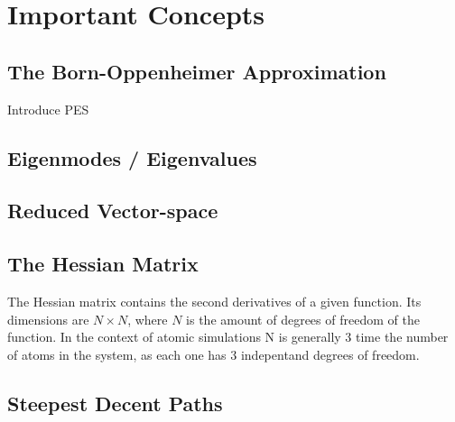 \section{Important Concepts}
\label{sec:important-concepts}

\subsection{The Born-Oppenheimer Approximation}
\label{sec:born-oppenheimer}

\bit
\item Introduce PES
\eit

\placeholder

\subsection{Eigenmodes / Eigenvalues}
\label{sec:eigenmodes}

\placeholder

\subsection{Reduced Vector-space}
\label{sec:reduced-space}

\placeholder

\subsection{The Hessian Matrix}
\label{sec:hessian}

The Hessian matrix contains the second derivatives of a given function.
Its dimensions are $N\times N$, where $N$ is the amount of degrees of freedom of the function.
In the context of atomic simulations N is generally 3 time the number of atoms in the system, as each one has 3 indepentand degrees of freedom.

\incomplete

\subsection{Steepest Decent Paths}
\label{sec:sdps}

\placeholder

